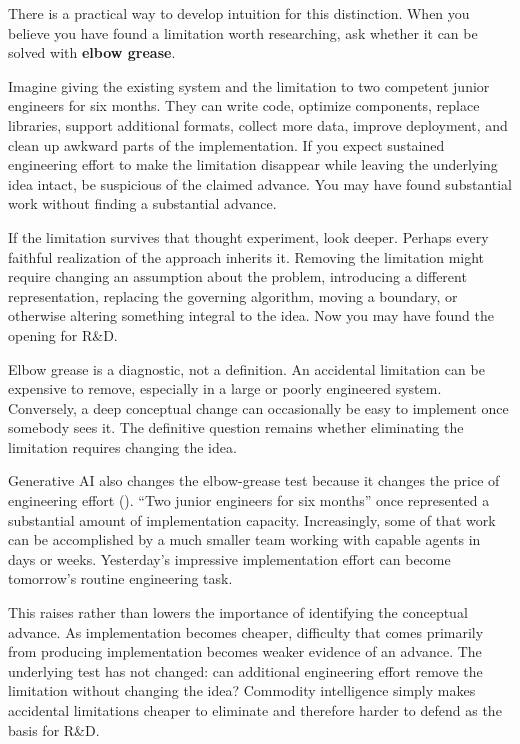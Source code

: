 There is a practical way to develop intuition for this distinction. When you believe you have found
a limitation worth researching, ask whether it can be solved with \textbf{elbow grease}.

Imagine giving the existing system and the limitation to two competent junior engineers for six
months. They can write code, optimize components, replace libraries, support additional formats,
collect more data, improve deployment, and clean up awkward parts of the implementation. If you
expect sustained engineering effort to make the limitation disappear while leaving the underlying
idea intact, be suspicious of the claimed advance. You may have found substantial work without
finding a substantial advance.

If the limitation survives that thought experiment, look deeper. Perhaps every faithful realization
of the approach inherits it. Removing the limitation might require changing an assumption about the
problem, introducing a different representation, replacing the governing algorithm, moving a
boundary, or otherwise altering something integral to the idea. Now you may have found the opening
for R\&D.

Elbow grease is a diagnostic, not a definition. An accidental limitation can be expensive to
remove, especially in a large or poorly engineered system. Conversely, a deep conceptual change can
occasionally be easy to implement once somebody sees it. The definitive question remains whether
eliminating the limitation requires changing the idea.

Generative AI also changes the elbow-grease test because it changes the price of engineering effort
(\citet{ch-software-engineering}). ``Two junior engineers for six months'' once represented a substantial
amount of implementation capacity. Increasingly, some of that work can be accomplished by a much
smaller team working with capable agents in days or weeks. Yesterday's impressive implementation
effort can become tomorrow's routine engineering task.

This raises rather than lowers the importance of identifying the conceptual advance. As
implementation becomes cheaper, difficulty that comes primarily from producing implementation
becomes weaker evidence of an advance. The underlying test has not changed: can additional
engineering effort remove the limitation without changing the idea? Commodity intelligence simply
makes accidental limitations cheaper to eliminate and therefore harder to defend as the basis for
R\&D.

